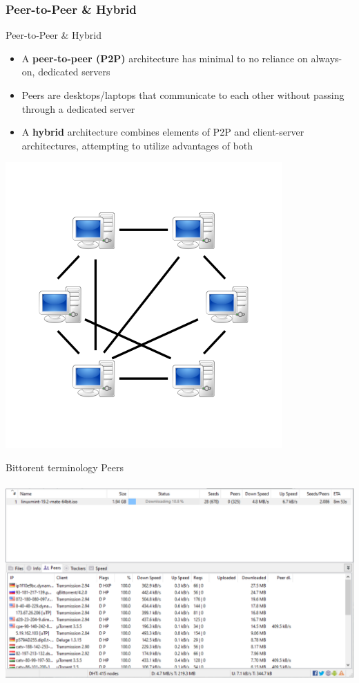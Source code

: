 \documentclass{beamer}
\begin{document}
       
        \subsubsection{Peer-to-Peer \& Hybrid}
        \begin{frame}{Peer-to-Peer \& Hybrid}
            \begin{itemize}
                \item A \textbf{peer-to-peer (P2P)} architecture has minimal to no reliance on always-on, dedicated servers
                \item Peers are desktops/laptops that communicate to each other without passing through a dedicated server
                \item A \textbf{hybrid} architecture combines elements of P2P and client-server architectures, attempting to utilize advantages of both
            \end{itemize}
            \centering
            \includegraphics[scale=0.5]{P2P-network.png}
        \end{frame}
        
        \begin{frame}{Bittorent terminology}
            Peers \\ \\ 
             \centering
            \includegraphics[scale=0.5]{bit-2.PNG}
        \end{frame}
        
\end{document}
